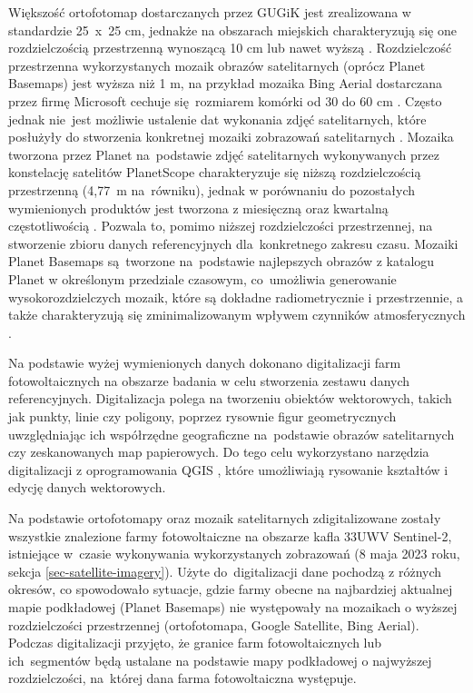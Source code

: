 \documentclass{amuthesis}
\begin{document}
Większość ortofotomap dostarczanych przez GUGiK jest zrealizowana w
standardzie 25~x~25 cm, jednakże na obszarach miejskich charakteryzują
się one rozdzielczością przestrzenną wynoszącą 10 cm lub nawet wyższą
\autocite{ortofotomapa}. Rozdzielczość przestrzenna wykorzystanych
mozaik obrazów satelitarnych (oprócz Planet Basemaps) jest wyższa niż 1
m, na przykład mozaika Bing Aerial dostarczana przez firmę Microsoft
cechuje się~rozmiarem komórki od 30 do 60 cm \autocite{bing_aerial}.
Często jednak nie~jest możliwie ustalenie dat wykonania zdjęć
satelitarnych, które posłużyły do stworzenia konkretnej mozaiki
zobrazowań satelitarnych \autocite{lesiv_2018_sat_imagery_mosaics}.
Mozaika tworzona przez Planet na~podstawie zdjęć satelitarnych
wykonywanych przez konstelację satelitów PlanetScope charakteryzuje się
niższą rozdzielczością przestrzenną (4,77~m na~równiku), jednak w
porównaniu do pozostałych wymienionych produktów jest tworzona z
miesięczną oraz kwartalną częstotliwością
\autocite{planet_2019_basemaps}. Pozwala to, pomimo niższej
rozdzielczości przestrzennej, na stworzenie zbioru danych referencyjnych
dla~konkretnego zakresu czasu. Mozaiki Planet Basemaps \autocite{planet}
są~tworzone na~podstawie najlepszych obrazów z katalogu Planet w
określonym przedziale czasowym, co~umożliwia generowanie
wysokorozdzielczych mozaik, które są dokładne radiometrycznie i
przestrzennie, a także charakteryzują się zminimalizowanym wpływem
czynników atmosferycznych \autocite{planet_2019_basemaps}.

Na podstawie wyżej wymienionych danych dokonano digitalizacji farm
fotowoltaicznych na obszarze badania w celu stworzenia zestawu danych
referencyjnych. Digitalizacja polega na tworzeniu obiektów wektorowych,
takich jak punkty, linie czy poligony, poprzez rysownie figur
geometrycznych uwzględniając ich współrzędne geograficzne na~podstawie
obrazów satelitarnych czy zeskanowanych map papierowych. Do tego celu
wykorzystano narzędzia digitalizacji z oprogramowania QGIS
\autocite{qgis}, które umożliwiają rysowanie kształtów i edycję danych
wektorowych.

Na podstawie ortofotomapy oraz mozaik satelitarnych zdigitalizowane
zostały wszystkie znalezione farmy fotowoltaiczne na obszarze kafla
33UWV Sentinel-2, istniejące w~czasie wykonywania wykorzystanych
zobrazowań (8 maja 2023 roku, sekcja \ref{sec-satellite-imagery}). Użyte
do~digitalizacji dane pochodzą z różnych okresów, co spowodowało
sytuacje, gdzie farmy obecne na najbardziej aktualnej mapie podkładowej
(Planet Basemaps) nie występowały na mozaikach o wyższej rozdzielczości
przestrzennej (ortofotomapa, Google Satellite, Bing Aerial). Podczas
digitalizacji przyjęto, że granice farm fotowoltaicznych lub
ich~segmentów będą ustalane na podstawie mapy podkładowej o najwyższej
rozdzielczości, na~której dana farma fotowoltaiczna występuje.
\end{document}
